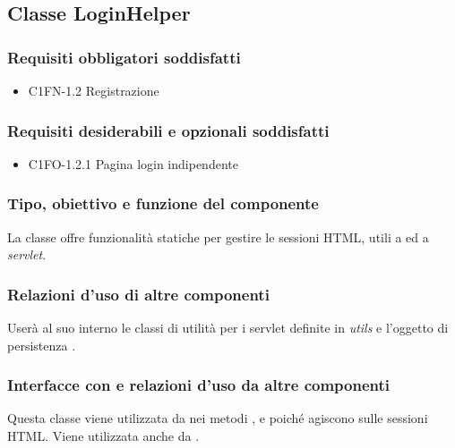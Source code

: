 \subsection{Classe LoginHelper}
\subsubsection*{Requisiti obbligatori soddisfatti}
\begin{itemize}
    \item C1FN-1.2 Registrazione
\end{itemize}
\subsubsection*{Requisiti desiderabili e opzionali soddisfatti}
\begin{itemize}
    \item C1FO-1.2.1 Pagina login indipendente
\end{itemize}
\subsubsection*{Tipo, obiettivo e funzione del componente}
La classe  offre funzionalit\`a statiche
per gestire le sessioni HTML, utili a  ed a
\emph{servlet}.
\subsubsection*{Relazioni d'uso di altre componenti}
User\`a al suo interno le classi di utilit\`a per i servlet definite in
\emph{utils} e l'oggetto di persistenza .
\subsubsection*{Interfacce con e relazioni d'uso da altre componenti}
Questa classe viene utilizzata da  nei metodi ,
 e  poich\'e agiscono sulle sessioni HTML.
Viene utilizzata anche da .
